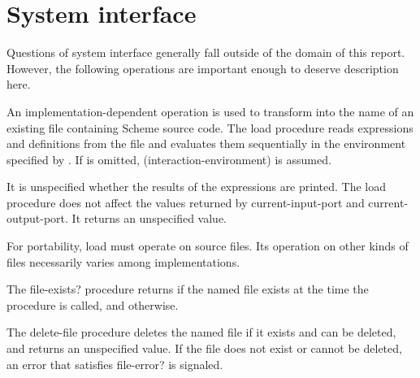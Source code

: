 \section{System interface}

Questions of system interface generally fall outside of the domain of this
report.  However, the following operations are important enough to
deserve description here.


\begin{entry}{%
}

An implementation-dependent operation is used to transform
 into the name of an existing file
containing Scheme source code.  The {\cf load} procedure reads
expressions and definitions from the file and evaluates them
sequentially in the environment specified by .
If  is omitted, {\cf (interaction-environment)}
is assumed.

It is unspecified whether the results of the expressions
are printed.  The {\cf load} procedure does not affect the values
returned by {\cf current-input-port} and {\cf current-output-port}.
It returns an unspecified value.


\begin{rationale}
For portability, {\cf load} must operate on source files.
Its operation on other kinds of files necessarily varies among
implementations.
\end{rationale}
\end{entry}

\begin{entry}{%
}

The {\cf file-exists?} procedure returns
\schtrue{} if the named file exists at the time the procedure is called,
and \schfalse{} otherwise.

\end{entry}

\begin{entry}{%
}

The {\cf delete-file} procedure deletes the
named file if it exists and can be deleted, and returns an unspecified
value.  If the file does not exist or cannot be deleted, an error
that satisfies {\cf file-error?} is signaled.

\end{entry}

